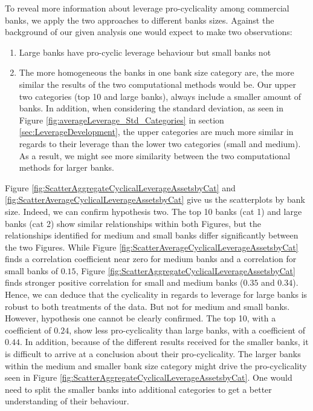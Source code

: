 \documentclass[12pt, a4paper]{article} %
\begin{document}
To reveal more information about leverage pro-cyclicality among commercial banks, we apply the two approaches to different banks sizes. Against the background of our given analysis one would expect to make two observations:
\begin{enumerate}
\item Large banks have pro-cyclic leverage behaviour but small banks not
\item The more homogeneous the banks in one bank size category are, the more similar the results of the two computational methods would be. Our upper two categories (top 10 and large banks), always include a smaller amount of banks. In addition, when considering the standard deviation, as seen in Figure \ref{fig:averageLeverage_Std_Categories} in section \ref{sec:LeverageDevelopment}, the upper categories are much more similar in regards to their leverage than the lower two categories (small and medium). As a result, we might see more similarity between the two computational methods for larger banks. 
\end{enumerate}
Figure \ref{fig:ScatterAggregateCyclicalLeverageAssetsbyCat} and \ref{fig:ScatterAverageCyclicalLeverageAssetsbyCat} give us the scatterplots by bank size. 
Indeed, we can confirm hypothesis two. The top 10 banks (cat 1) and large banks (cat 2) show similar relationships within both Figures, but the relationships identified for medium and small banks differ significantly between the two Figures. While Figure \ref{fig:ScatterAverageCyclicalLeverageAssetsbyCat} finds a correlation coefficient near zero for medium banks and a correlation for small banks of $0.15$, Figure \ref{fig:ScatterAggregateCyclicalLeverageAssetsbyCat} finds stronger positive correlation for small and medium banks ($0.35$ and $0.34$). Hence, we can deduce that the cyclicality in regards to leverage for large banks is robust to both treatments of the data. But not for medium and small banks. 
However, hypothesis one cannot be clearly confirmed. The top 10, with a coefficient of $0.24$, show less pro-cyclicality than large banks, with a coefficient of $0.44$. In addition, because of the different results received for the smaller banks, it is difficult to arrive at a conclusion about their pro-cyclicality. The larger banks within the medium and smaller bank size category might drive the pro-cyclicality seen in Figure \ref{fig:ScatterAggregateCyclicalLeverageAssetsbyCat}. 
One would need to split the smaller banks into additional categories to get a better understanding of their behaviour. 
\end{document}
